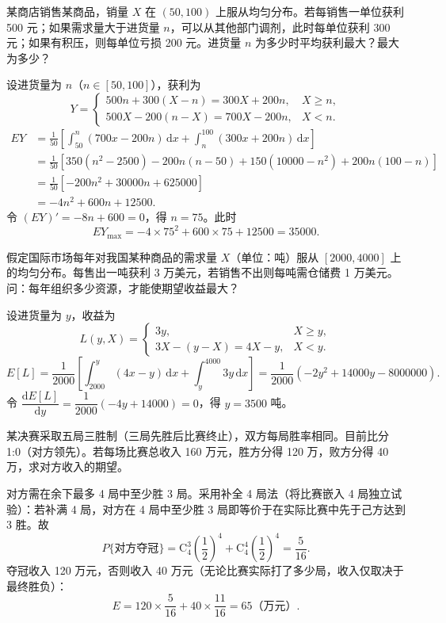 \documentclass[lang=cn,11pt]{elegantbook}
\begin{document}
\begin{exercise}\label{exer:4-20-shop}
某商店销售某商品，销量 \(X\) 在 \((50,100)\) 上服从均匀分布。若每销售一单位获利 500 元；如果需求量大于进货量 \(n\)，可以从其他部门调剂，此时每单位获利 300 元；如果有积压，则每单位亏损 200 元。进货量 \(n\) 为多少时平均获利最大？最大为多少？
\end{exercise}
\begin{solution}
设进货量为 \(n\)（\(n \in [50,100]\)），获利为
\[
Y = \begin{cases} 500n + 300(X-n) = 300X + 200n, & X \geqslant n, \\[4pt] 500X - 200(n-X) = 700X - 200n, & X < n. \end{cases}
\]
\[
\begin{aligned}
EY &= \frac{1}{50}\left[\int_{50}^{n}(700x - 200n)\,\mathrm{d}x + \int_{n}^{100}(300x + 200n)\,\mathrm{d}x\right] \\
&= \frac{1}{50}\left[350(n^2-2500) - 200n(n-50) + 150(10000-n^2) + 200n(100-n)\right] \\
&= \frac{1}{50}\left[-200n^2 + 30000n + 625000\right] \\
&= -4n^2 + 600n + 12500.
\end{aligned}
\]
令 \((EY)' = -8n + 600 = 0\)，得 \(n = 75\)。此时
\[
EY_{\max} = -4 \times 75^2 + 600 \times 75 + 12500 = 35000.
\]
\end{solution}

\begin{exercise}\label{exer:4-trade}
假定国际市场每年对我国某种商品的需求量 \(X\)（单位：吨）服从 \([2000, 4000]\) 上的均匀分布。每售出一吨获利 3 万美元，若销售不出则每吨需仓储费 1 万美元。问：每年组织多少资源，才能使期望收益最大？
\end{exercise}
\begin{solution}
设进货量为 \(y\)，收益为
\[
L(y,X) = \begin{cases} 3y, & X \geqslant y, \\[4pt] 3X - (y - X) = 4X - y, & X < y. \end{cases}
\]
\[
E[L] = \frac{1}{2000}\left[\int_{2000}^{y}(4x - y)\,\mathrm{d}x + \int_{y}^{4000}3y\,\mathrm{d}x\right]
= \frac{1}{2000}(-2y^2 + 14000y - 8000000).
\]
令 \(\dfrac{\mathrm{d}E[L]}{\mathrm{d}y} = \dfrac{1}{2000}(-4y + 14000) = 0\)，得 \(y = 3500\) 吨。
\end{solution}

\begin{exercise}\label{exer:4-basketball}
某决赛采取五局三胜制（三局先胜后比赛终止），双方每局胜率相同。目前比分 1:0（对方领先）。若每场比赛总收入 160 万元，胜方分得 120 万，败方分得 40 万，求对方收入的期望。
\end{exercise}
\begin{solution}
对方需在余下最多 4 局中至少胜 3 局。采用补全 4 局法（将比赛嵌入 4 局独立试验）：若补满 4 局，对方在 4 局中至少胜 3 局即等价于在实际比赛中先于己方达到 3 胜。故
\[
P\{\text{对方夺冠}\} = \mathrm{C}_4^3\!\left(\frac{1}{2}\right)^{\!4} + \mathrm{C}_4^4\!\left(\frac{1}{2}\right)^{\!4} = \frac{5}{16}.
\]
夺冠收入 120 万元，否则收入 40 万元（无论比赛实际打了多少局，收入仅取决于最终胜负）：
\[
E = 120 \times \frac{5}{16} + 40 \times \frac{11}{16} = 65 \text{（万元）}.
\]
\end{solution}
\end{document}
